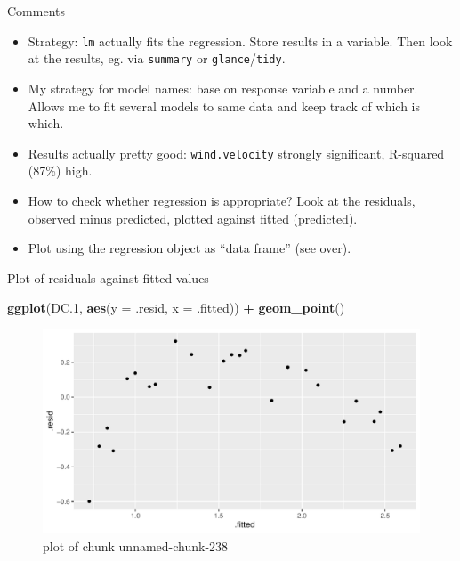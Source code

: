 \documentclass[ignorenonframetext,]{beamer}
\newenvironment{Shaded}{\begin{snugshade}}{\end{snugshade}}
\newcommand{\DataTypeTok}[1]{\textcolor[rgb]{0.13,0.29,0.53}{#1}}
\newcommand{\FloatTok}[1]{\textcolor[rgb]{0.00,0.00,0.81}{#1}}
\newcommand{\KeywordTok}[1]{\textcolor[rgb]{0.13,0.29,0.53}{\textbf{#1}}}
\newcommand{\NormalTok}[1]{#1}
\newcommand{\OperatorTok}[1]{\textcolor[rgb]{0.81,0.36,0.00}{\textbf{#1}}}
\newcommand{\StringTok}[1]{\textcolor[rgb]{0.31,0.60,0.02}{#1}}
\providecommand{\tightlist}{%
  \setlength{\itemsep}{0pt}\setlength{\parskip}{0pt}}
\begin{document}
\begin{frame}[fragile]{Comments}
\protect\hypertarget{comments-14}{}

\begin{itemize}
\tightlist
\item
  Strategy: \texttt{lm} actually fits the regression. Store results in a
  variable. Then look at the results, eg. via \texttt{summary} or
  \texttt{glance}/\texttt{tidy}.
\item
  My strategy for model names: base on response variable and a number.
  Allows me to fit several models to same data and keep track of which
  is which.
\item
  Results actually pretty good: \texttt{wind.velocity} strongly
  significant, R-squared (87\%) high.
\item
  How to check whether regression is appropriate? Look at the residuals,
  observed minus predicted, plotted against fitted (predicted).
\item
  Plot using the regression object as ``data frame'' (see over).
\end{itemize}

\end{frame}

\begin{frame}[fragile]{Plot of residuals against fitted values}
\protect\hypertarget{plot-of-residuals-against-fitted-values}{}

\begin{Shaded}
\begin{Highlighting}[]
\KeywordTok{ggplot}\NormalTok{(DC}\FloatTok{.1}\NormalTok{, }\KeywordTok{aes}\NormalTok{(}\DataTypeTok{y =}\NormalTok{ .resid, }\DataTypeTok{x =}\NormalTok{ .fitted)) }\OperatorTok{+}\StringTok{ }\KeywordTok{geom_point}\NormalTok{()}
\end{Highlighting}
\end{Shaded}

\begin{figure}
\centering
\includegraphics{figure/unnamed-chunk-238-1.pdf}
\caption{plot of chunk unnamed-chunk-238}
\end{figure}

\end{frame}
\end{document}
